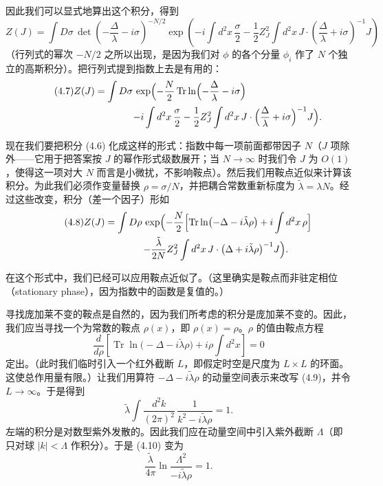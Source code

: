 因此我们可以显式地算出这个积分，得到
\begin{equation}
  \tag{4.6}
  \label{eq:4-6}
  Z(J)=\int D\sigma\,\det\left(-\frac{\Delta}{\lambda}-i\sigma\right)^{-N/2}\exp\left(-i\int d^2x\,\frac{\sigma}{2}-\frac{1}{2}Z_J^2\int d^2x\,J\cdot\left(\frac{\Delta}{\lambda}+i\sigma\right)^{-1}J\right)
\end{equation}
（行列式的幂次 $-N/2$ 之所以出现，是因为我们对 $\phi$ 的各个分量 $\phi_i$ 作了 $N$ 个独立的高斯积分）。把行列式提到指数上去是有用的：
\begin{align}
  \tag{4.7}
  \label{eq:4-7}
  Z(J)&=\int D\sigma\,\exp\Bigl(-\frac{N}{2}\operatorname{Tr}\ln\Bigl(-\frac{\Delta}{\lambda}-i\sigma\Bigr)\Bigr.\nonumber\\
  &\qquad\qquad\Bigl.-i\int d^2x\,\frac{\sigma}{2}-\frac{1}{2}Z_J^2\int d^2x\,J\cdot\Bigl(\frac{\Delta}{\lambda}+i\sigma\Bigr)^{-1}J\Bigr).
\end{align}

现在我们要把积分 (4.6) 化成这样的形式：指数中每一项前面都带因子 $N$（$J$ 项除外——它用于把答案按 $J$ 的幂作形式级数展开；当 $N\to\infty$ 时我们令 $J$ 为 $O(1)$，使得这一项对大 $N$ 而言是小微扰，不影响鞍点）。然后我们用鞍点近似来计算该积分。为此我们必须作变量替换 $\rho=\sigma/N$，并把耦合常数重新标度为 $\tilde\lambda=\lambda N$。经过这些改变，积分（差一个因子）形如
\begin{align}
  \tag{4.8}
  \label{eq:4-8}
  Z(J)&=\int D\rho\,\exp\Bigl(-\frac{N}{2}\Bigl[\operatorname{Tr}\ln\bigl(-\Delta-i\tilde\lambda\rho\bigr)+i\int d^2x\,\rho\Bigr]\Bigr.\nonumber\\
  &\qquad\qquad\Bigl.-\frac{\tilde\lambda}{2N}Z_J^2\int d^2x\,J\cdot\bigl(\Delta+i\tilde\lambda\rho\bigr)^{-1}J\Bigr).
\end{align}

在这个形式中，我们已经可以应用鞍点近似了。（这里确实是鞍点而非驻定相位（stationary phase），因为指数中的函数是复值的。）

寻找庞加莱不变的鞍点是自然的，因为我们所考虑的积分是庞加莱不变的。因此，我们应当寻找一个为常数的鞍点 $\rho(x)$，即 $\rho(x)=\rho$。$\rho$ 的值由鞍点方程
\begin{equation}
  \tag{4.9}
  \label{eq:4-9}
  \frac{d}{d\rho}\left[\operatorname{Tr}\ln\bigl(-\Delta-i\tilde\lambda\rho\bigr)+i\rho\int d^2x\right]=0
\end{equation}
定出。（此时我们临时引入一个红外截断 $L$，即假定时空是尺度为 $L\times L$ 的环面。这使总作用量有限。）让我们用算符 $-\Delta-i\tilde\lambda\rho$ 的动量空间表示来改写 (4.9)，并令 $L\to\infty$。于是得到
\begin{equation}
  \tag{4.10}
  \label{eq:4-10}
  \tilde\lambda\int\frac{d^2k}{(2\pi)^2}\,\frac{1}{k^2-i\tilde\lambda\rho}=1 .
\end{equation}
左端的积分是对数型紫外发散的。因此我们应在动量空间中引入紫外截断 $\Lambda$（即只对球 $|k|<\Lambda$ 作积分）。于是 (4.10) 变为
\begin{equation}
  \tag{4.11}
  \label{eq:4-11}
  \frac{\tilde\lambda}{4\pi}\ln\frac{\Lambda^2}{-i\tilde\lambda\rho}=1 .
\end{equation}

